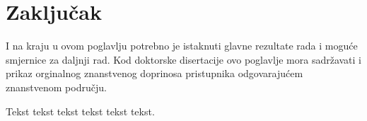 \chapter{Zaklju\v{c}ak}
I na kraju u ovom poglavlju potrebno je istaknuti glavne rezultate
rada i mogu\'{c}e smjernice za daljnji rad. Kod doktorske disertacije
ovo poglavlje mora sadr\v{z}avati i prikaz orginalnog znanstvenog
doprinosa pristupnika odgovaraju\'{c}em znanstvenom podru\v{c}ju.

Tekst tekst tekst tekst tekst tekst. %
